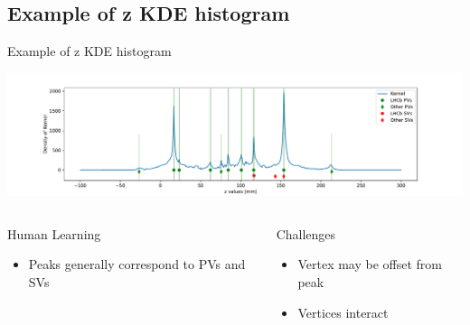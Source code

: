 \subsection{Example of z KDE histogram}
\begin{frame}{Example of z KDE histogram}
\begin{center}
    \includegraphics[width=\textwidth, trim=100 30 100 100]{images/kernel_and_pvs.pdf}
\end{center}
\begin{columns}[t]
    \begin{block}{Human Learning}
    \begin{itemize}
        \item Peaks generally correspond to PVs and SVs
    \end{itemize}
    \end{block}
    
    \begin{block}{Challenges}
    \begin{itemize}
        \item Vertex may be offset from peak
        \item Vertices interact
    \end{itemize}
    \end{block}
\end{columns}
\end{frame}


